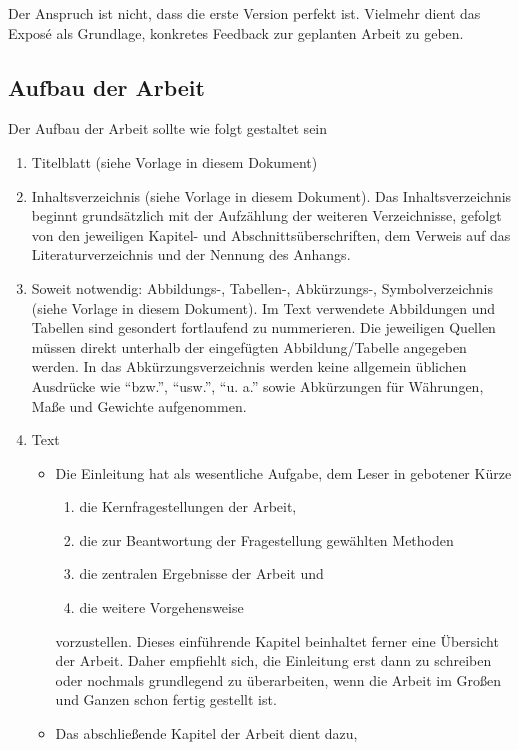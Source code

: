 \documentclass[a4paper,12pt]{scrartcl} %
\begin{document}
Der Anspruch ist nicht, dass die erste Version perfekt ist. Vielmehr dient das Exposé als Grundlage, konkretes Feedback zur geplanten Arbeit zu geben.

\subsection{Aufbau der Arbeit}\label{subsec:aufbau}
Der Aufbau der Arbeit sollte wie folgt gestaltet sein
\begin{enumerate}
\item Titelblatt (siehe Vorlage in diesem Dokument)
\item Inhaltsverzeichnis (siehe Vorlage in diesem Dokument). Das Inhaltsverzeichnis beginnt grundsätzlich mit der Aufzählung der weiteren Verzeichnisse, gefolgt von den jeweiligen Kapitel- und Abschnittsüberschriften, dem Verweis auf das Literaturverzeichnis und der Nennung des Anhangs.
\item Soweit notwendig: Abbildungs-, Tabellen-, Abkürzungs-, Symbolverzeichnis (siehe Vorlage in diesem Dokument). Im Text verwendete Abbildungen und Tabellen sind gesondert fortlaufend zu nummerieren. Die jeweiligen Quellen müssen direkt unterhalb der eingefügten Abbildung/Tabelle angegeben werden. In das Abkürzungsverzeichnis werden keine allgemein üblichen Ausdrücke wie ``bzw.'', ``usw.'', ``u. a.'' sowie Abkürzungen für Währungen, Maße und Gewichte aufgenommen.
\item Text
	\begin{itemize}
	\item Die Einleitung hat als wesentliche Aufgabe, dem Leser in gebotener Kürze
    \begin{enumerate}[label=\roman*.]
        \item die Kernfragestellungen der Arbeit,
        \item die zur Beantwortung der Fragestellung gewählten Methoden
        \item die zentralen Ergebnisse der Arbeit und
        \item die weitere Vorgehensweise
    \end{enumerate}
    vorzustellen. Dieses einführende Kapitel beinhaltet ferner eine
    Übersicht der Arbeit. Daher empfiehlt sich, die Einleitung erst dann zu
    schreiben oder nochmals grundlegend zu überarbeiten, wenn die Arbeit im Großen und Ganzen schon fertig gestellt ist.
	\item Das abschließende Kapitel der Arbeit dient dazu,
    \begin{enumerate}[label=\roman*.]

\end{enumerate}
\end{itemize}
\end{enumerate}
\end{document}
